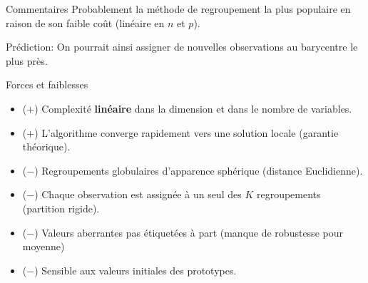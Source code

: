 \documentclass[
  ignorenonframetext,
]{beamer}
\providecommand{\tightlist}{%
  \setlength{\itemsep}{0pt}\setlength{\parskip}{0pt}}\usepackage{longtable,booktabs,array}
\begin{document}
\begin{frame}{Commentaires}
\protect\hypertarget{commentaires}{}
Probablement la méthode de regroupement la plus populaire en raison de
son faible coût (linéaire en \(n\) et \(p\)).

Prédiction: On pourrait ainsi assigner de nouvelles observations au
barycentre le plus près.
\end{frame}

\begin{frame}{Forces et faiblesses}
\protect\hypertarget{forces-et-faiblesses}{}
\begin{itemize}
\tightlist
\item
  (\(+\)) Complexité \textbf{linéaire} dans la dimension et dans le
  nombre de variables.
\item
  (\(+\)) L'algorithme converge rapidement vers une solution locale
  (garantie théorique).
\item
  (\(-\)) Regroupements globulaires d'apparence sphérique (distance
  Euclidienne).
\item
  (\(-\)) Chaque observation est assignée à un seul des \(K\)
  regroupements (partition rigide).
\item
  (\(-\)) Valeurs aberrantes pas étiquetées à part (manque de robustesse
  pour moyenne)
\item
  (\(-\)) Sensible aux valeurs initiales des prototypes.
\end{itemize}
\end{frame}
\end{document}
